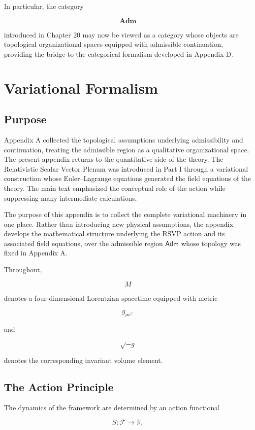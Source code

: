 \documentclass[11pt,oneside]{book}
\numberwithin{equation}{chapter}
\theoremstyle{definition}
\theoremstyle{plain}
\newcommand{\Adm}{\mathsf{Adm}}
\begin{document}
In particular, the category

\[
\mathbf{Adm}
\]

introduced in Chapter 20 may now be viewed as a category whose objects are
topological organizational spaces equipped with admissible continuation,
providing the bridge to the categorical formalism developed in Appendix D.

\chapter{Variational Formalism}

\section{Purpose}

Appendix A collected the topological assumptions underlying admissibility
and continuation, treating the admissible region as a qualitative
organizational space. The present appendix returns to the quantitative
side of the theory. The Relativistic Scalar Vector Plenum was introduced in
Part I through a variational construction whose Euler--Lagrange equations
generated the field equations of the theory. The main text emphasized the
conceptual role of the action while suppressing many intermediate
calculations.

The purpose of this appendix is to collect the complete variational
machinery in one place. Rather than introducing new physical assumptions,
the appendix develops the mathematical structure underlying the RSVP
action and its associated field equations, over the admissible region
\(\Adm\) whose topology was fixed in Appendix A.

Throughout,

\[
M
\]

denotes a four-dimensional Lorentzian spacetime equipped with metric

\[
g_{\mu\nu},
\]

and

\[
\sqrt{-g}
\]

denotes the corresponding invariant volume element.

\section{The Action Principle}

The dynamics of the framework are determined by an action functional

\[
S
:
\mathcal F
\rightarrow
\mathbb R,
\]
\end{document}
